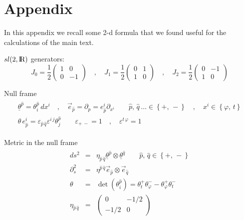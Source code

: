 \documentclass[a4paper,10pt]{article}
\begin{document}
\section{Appendix}
In this appendix we recall some 2-d formula that we found useful for the
calculations of the main  text.

$sl(2,{\hbox{{\rm I}\kern-.2em\hbox{\rm R}}})$ generators:
\begin{equation}
J_0=\frac 1 2 \left ( \begin{array} {cc} 1 & 0 \\ 0 & -1  \end{array}  
\right ) \quad , \quad
J_1=\frac 1 2 \left ( \begin{array} {cc} 0 & 1 \\ 1 & 0  \end{array}  
\right )  \quad , \quad  
J_2=\frac 1 2 \left ( \begin{array} {cc} 0 & -1 \\ 1 & 0  \end{array}  
\right ) 
\end{equation}

Null frame
\begin{eqnarray} \begin{array}{l}
{\underline \theta}^{\hat p}=\theta^{\hat p}_i\, dx^i\quad,\quad 
{\vec e}_{\hat p}=\partial_{\hat p}=e_{\hat p}^i\partial_{x^i} \qquad 
\hat p,\,\hat q\, \dots  \in \left\{ +,\,-\right\} \quad,\quad 
x^i \in \left\{\varphi,\, t\right\}\\
\theta\,e_{\hat  p}^i=\varepsilon_{\hat p\,\hat q}\varepsilon^{i\,
  j}\theta^{\hat p}_j\qquad \varepsilon_{+\,-}=1\quad ,\quad 
\varepsilon^{t\,\varphi}=1
\end{array} \end{eqnarray}

Metric in the null frame
\begin{eqnarray} \begin{array}{lcl}
ds^2 &=& \eta_{\hat p\,\hat q}{\underline \theta}^{\hat p}\otimes 
 {\underline \theta}^{\hat q}\qquad \hat
p,\,\hat q \in \left\{+,\,-\right\}\\
\partial_s^2&=&\eta^{\hat p\,\hat q}{\vec e}_{\hat p}\otimes 
  {\vec e}_{\hat q}\\
\theta&=&\det \left( \theta^{\hat p}_i \right )=\theta^+_t \theta^-_{\varphi}
-\theta^+_{\varphi}
\theta^-_t \\
 \eta _{\hat p \, \hat q} &=& \left(
\begin{array}{rr} 
0&-1/2\\ -1/2&0
\end{array} \right)
\end{array}\end{eqnarray}
\end{document}
